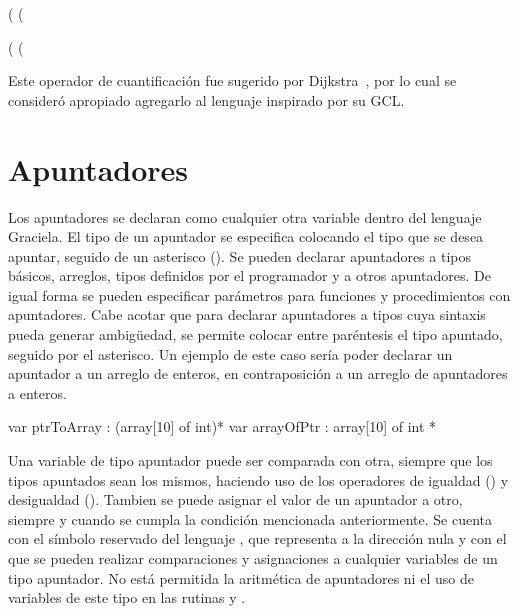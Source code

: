 \begin{gracielacode}[caption=Equivalencia entre cuantificador universal y count, label=lst:forallcount]
(%
    (%
\end{gracielacode}

\begin{gracielacode}[caption=Equivalencia entre cuantificador existencial y count, label=lst:existcount]
(%
    (%
\end{gracielacode}

Este operador de cuantificación fue sugerido por Dijkstra~\cite{ewd737}, por lo
cual se consideró apropiado agregarlo al lenguaje inspirado por su GCL.

\section{Apuntadores}

Los apuntadores se declaran como cualquier otra variable dentro del lenguaje
Graciela. El tipo de un apuntador se especifica colocando el tipo que se desea
apuntar, seguido de un asterisco (\ingra{*}). Se pueden declarar apuntadores a
tipos básicos, arreglos, tipos definidos por el programador y a otros
apuntadores. De igual forma se pueden especificar parámetros para funciones y
procedimientos con apuntadores. Cabe acotar que para declarar apuntadores a
tipos cuya sintaxis pueda generar ambigüedad, se permite colocar entre
paréntesis el tipo apuntado, seguido por el asterisco. Un ejemplo de este caso
sería poder declarar un apuntador a un arreglo de enteros, en contraposición a
un arreglo de apuntadores a enteros.

\begin{gracielacode}[caption=Arreglo de apuntadores y apuntador a arreglo, label=lst:arrPtr]
var ptrToArray : (array[10] of int)*
var arrayOfPtr :  array[10] of int *
\end{gracielacode}

Una variable de tipo apuntador puede ser comparada con otra, siempre que los
tipos apuntados sean los mismos, haciendo uso de los operadores de igualdad
(\ingra{==}) y desigualdad (\ingra{!=}). Tambien se puede asignar el valor
de un apuntador a otro, siempre y cuando se cumpla la condición mencionada
anteriormente. Se cuenta con el símbolo reservado del lenguaje
, que representa a la dirección nula y con el que se pueden
realizar comparaciones y asignaciones a cualquier variables de un
tipo apuntador. No está permitida la aritmética de apuntadores ni el uso de
variables de este tipo en las rutinas  y .

